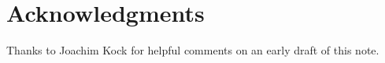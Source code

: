 \documentclass[11pt, article, one side]{memoir}
\theoremstyle{theorem}
\theoremstyle{definition}
\theoremstyle{remark}
\newcommand{\Cat}[1]{\mathsf{#1}}%
\newcommand{\ol}[1]{\overline{#1}}
\newcommand{\bun}{\Cat{Bun}}
\newcommand{\yon}{\mathcal{y}}
\newcommand{\poly}{\Cat{Poly}}
\newcommand{\dir}{\Cat{Dir}}
\newcommand{\ff}{\mathbb{F}}
\newcommand{\qqand}{\qquad\text{and}\qquad}
\begin{document}
\section*{Acknowledgments}

Thanks to Joachim Kock for helpful comments on an early draft of this note.

%
%
%
\end{document}
